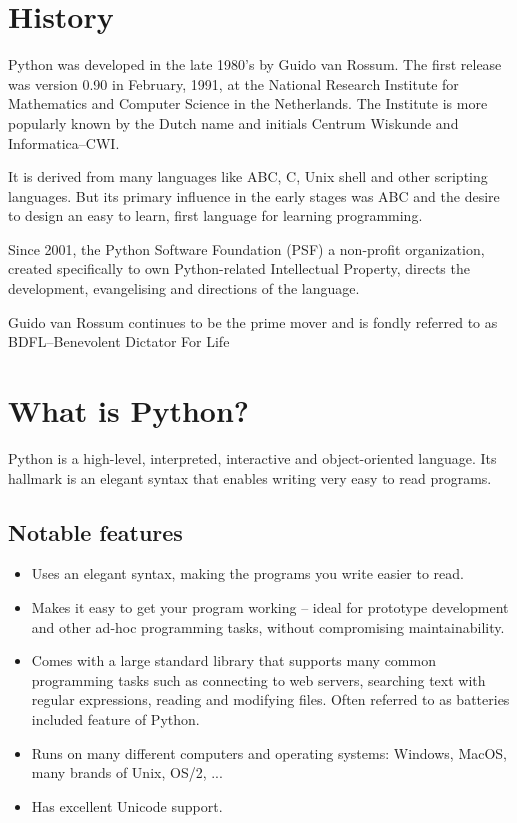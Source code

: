 \documentclass[]{book}
\begin{document}
    
    \section*{History}
        Python was developed in the late 1980’s by Guido van Rossum. The first release was version 0.90 in February, 1991, at the National Research Institute for Mathematics and Computer Science in the Netherlands. The Institute is more popularly known by the Dutch name and initials Centrum Wiskunde and Informatica–CWI.
        
        It is derived from many languages like ABC, C, Unix shell and other scripting languages. But its primary influence in the early stages was ABC and the desire to design an easy to learn, first language for learning programming.
        
        Since 2001, the Python Software Foundation (PSF) a non-profit organization, created specifically to own Python-related Intellectual Property, directs the development, evangelising and directions of the language.
        
        Guido van Rossum continues to be the prime mover and is fondly referred to as BDFL–Benevolent Dictator For Life
    
    \section*{What is Python?}
    Python is a high-level, interpreted, interactive and object-oriented language. Its hallmark is an elegant syntax that enables writing very easy to read programs.
    \subsection*{Notable features}
    \begin{itemize}
        \item Uses an elegant syntax, making the programs you write easier to read.
        \item Makes it easy to get your program working – ideal for prototype development and other ad-hoc programming tasks, without compromising maintainability.
        \item Comes with a large standard library that supports many common programming tasks such as connecting to web servers, searching text with regular expressions, reading and modifying files. Often referred to as batteries included feature of Python.
        \item Runs on many different computers and operating systems: Windows, MacOS, many brands of Unix, OS/2, ...
        \item Has excellent Unicode support.
    \end{itemize}
\end{document}
